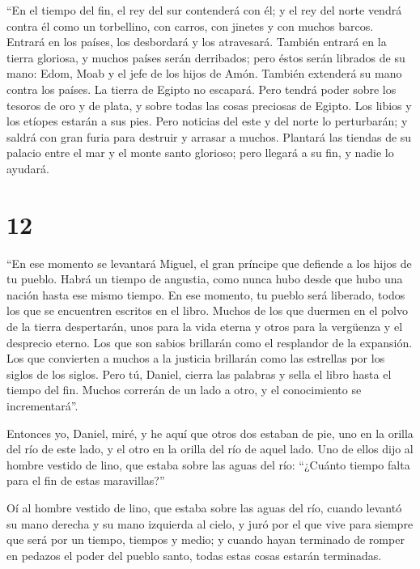  ``En el tiempo del fin, el rey del sur contenderá con
él; y el rey del norte vendrá contra él como un torbellino, con carros,
con jinetes y con muchos barcos. Entrará en los países, los desbordará y
los atravesará.  También entrará en la tierra gloriosa, y
muchos países serán derribados; pero éstos serán librados de su mano:
Edom, Moab y el jefe de los hijos de Amón.  También
extenderá su mano contra los países. La tierra de Egipto no escapará.
 Pero tendrá poder sobre los tesoros de oro y de plata, y
sobre todas las cosas preciosas de Egipto. Los libios y los etíopes
estarán a sus pies.  Pero noticias del este y del norte
lo perturbarán; y saldrá con gran furia para destruir y arrasar a
muchos.  Plantará las tiendas de su palacio entre el mar
y el monte santo glorioso; pero llegará a su fin, y nadie lo ayudará.

\hypertarget{section-11}{%
\section{12}\label{section-11}}

 ``En ese momento se levantará Miguel, el gran príncipe
que defiende a los hijos de tu pueblo. Habrá un tiempo de angustia, como
nunca hubo desde que hubo una nación hasta ese mismo tiempo. En ese
momento, tu pueblo será liberado, todos los que se encuentren escritos
en el libro.  Muchos de los que duermen en el polvo de la
tierra despertarán, unos para la vida eterna y otros para la vergüenza y
el desprecio eterno.  Los que son sabios brillarán como el
resplandor de la expansión. Los que convierten a muchos a la justicia
brillarán como las estrellas por los siglos de los siglos.
 Pero tú, Daniel, cierra las palabras y sella el libro
hasta el tiempo del fin. Muchos correrán de un lado a otro, y el
conocimiento se incrementará''.

 Entonces yo, Daniel, miré, y he aquí que otros dos
estaban de pie, uno en la orilla del río de este lado, y el otro en la
orilla del río de aquel lado.  Uno de ellos dijo al hombre
vestido de lino, que estaba sobre las aguas del río: ``¿Cuánto tiempo
falta para el fin de estas maravillas?''

 Oí al hombre vestido de lino, que estaba sobre las aguas
del río, cuando levantó su mano derecha y su mano izquierda al cielo, y
juró por el que vive para siempre que será por un tiempo, tiempos y
medio; y cuando hayan terminado de romper en pedazos el poder del pueblo
santo, todas estas cosas estarán terminadas.

